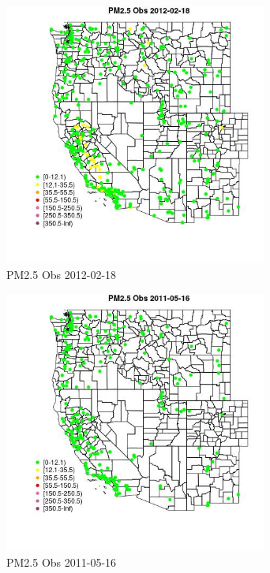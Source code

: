 \begin{figure} 
\centering  
\includegraphics[width=0.77\textwidth]{Code_Outputs/Report_ML_input_PM25_Step4_part_f_de_duplicated_aves_prioritize_24hr_obswNAs_MapObsPM25_Obs2012-02-18.jpg} 
\caption{\label{fig:Report_ML_input_PM25_Step4_part_f_de_duplicated_aves_prioritize_24hr_obswNAsMapObsPM25_Obs2012-02-18}PM2.5 Obs 2012-02-18} 
\end{figure} 
 

\begin{figure} 
\centering  
\includegraphics[width=0.77\textwidth]{Code_Outputs/Report_ML_input_PM25_Step4_part_f_de_duplicated_aves_prioritize_24hr_obswNAs_MapObsPM25_Obs2011-05-16.jpg} 
\caption{\label{fig:Report_ML_input_PM25_Step4_part_f_de_duplicated_aves_prioritize_24hr_obswNAsMapObsPM25_Obs2011-05-16}PM2.5 Obs 2011-05-16} 
\end{figure} 
 

